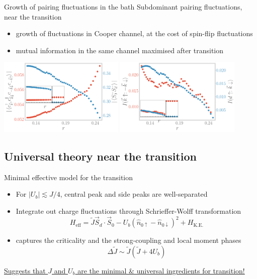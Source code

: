 \documentclass[8pt,aspectratio=169]{beamer}
\newcommand{\nitem}{\item[\ding{51}]}
\begin{document}
\begin{frame}{Growth of pairing fluctuations in the bath}
\centering
\alert{Subdominant pairing fluctuations, near the transition}

\vspace*{\fill}

\begin{itemize}
	\nitem growth of fluctuations in Cooper channel, at the cost of spin-flip fluctuations
	\nitem mutual information in the same channel maximised after transition
\end{itemize}

\vspace*{\fill}

\includegraphics[width=0.45\textwidth]{spinflip-pairing.pdf}
\hspace*{\fill}
\includegraphics[width=0.45\textwidth]{I_k.pdf}
\end{frame}

\begin{frame}{}
\section{Universal theory near the transition}
\end{frame}
\begin{frame}{Minimal effective model for the transition}
\centering
\begin{itemize}
	\nitem For \(|U_b| \lesssim J/4\), central peak and side peaks are \alert{well-separated} \\[10pt]
	\nitem \alert{Integrate out} charge fluctuations through Schrieffer-Wolff transformation
\[H_\text{eff} = \tilde J \vec{S}_d\cdot\vec{S}_0 - U_b\left(\hat n_{0 \uparrow} - \hat n_{0 \downarrow}\right)^2 + H_\text{K.E.}\]
\nitem \alert{captures} the criticality and the strong-coupling and local moment phases
\[ \Delta \tilde J \sim \tilde J \left( \tilde J  + 4U_b \right) \]
\end{itemize}

\vspace*{\fill}

\underline{Suggests that $J$ and $U_b$ are the \alert{minimal \& universal} ingredients for transition!}

\end{frame}
\end{document}
